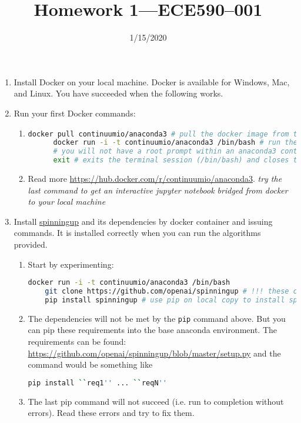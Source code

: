 \documentclass{article}
\title{Homework 1---ECE590--001}
\date{1/15/2020}
\begin{document}
\maketitle
\begin{enumerate}
\item
  Install Docker on your local machine. Docker is available for Windows, Mac,
and Linux. You have succeeded when the following works.
\item
  Run your first Docker commands:
  \begin{enumerate}
  \item 
    \begin{lstlisting}[language=bash]
      docker pull continuumio/anaconda3 # pull the docker image from the container registry
      docker run -i -t continuumio/anaconda3 /bin/bash # run the image interactively
      # you will not have a root prompt within an anaconda3 containers
      exit # exits the terminal session (/bin/bash) and closes terminates the container
    \end{lstlisting}
  \item Read more \url{https://hub.docker.com/r/continuumio/anaconda3}. {\em try the last command
      to get an interactive jupyter notebook bridged from docker to your local machine}
  \end{enumerate}
\item
  Install \href{https://github.com/openai/spinningup}{spinningup} and its
dependencies by docker container and issuing commands. It is installed
correctly when you can run the algorithms provided.
\begin{enumerate}
\item Start by experimenting:
  \begin{lstlisting}[language=bash]
    docker run -i -t continuumio/anaconda3 /bin/bash
    git clone https://github.com/openai/spinningup # !!! these changes are not persistent
    pip install spinningup # use pip on local copy to install spinning up
  \end{lstlisting}
\item The dependencies will not be met by the {\tt pip} command above. But you can pip these
  requirements into the base anaconda environment. The requirements can be found:
  \url{https://github.com/openai/spinningup/blob/master/setup.py} and the command would be something
  like
  \begin{lstlisting}[language=bash]
    pip install ``req1'' ... ``reqN''
  \end{lstlisting}
\item The last pip command will not succeed (i.e. run to completion without errors). Read these errors and try to fix them.

\end{enumerate}
\end{enumerate}
\end{document}
